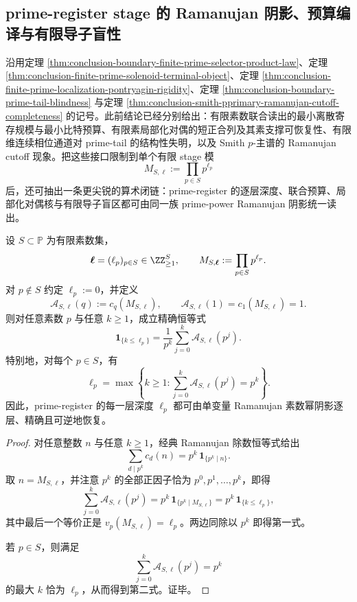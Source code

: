 \subsection{prime-register stage 的 Ramanujan 阴影、预算编译与有限导子盲性}\label{subsec:conclusion-prime-register-ramanujan-shadow-budget-localization-blindness}
沿用定理 \ref{thm:conclusion-boundary-finite-prime-selector-product-law}、定理 \ref{thm:conclusion-finite-prime-solenoid-terminal-object}、定理 \ref{thm:conclusion-finite-prime-localization-pontryagin-rigidity}、定理 \ref{thm:conclusion-boundary-prime-tail-blindness} 与定理 \ref{thm:conclusion-smith-pprimary-ramanujan-cutoff-completeness} 的记号。此前结论已经分别给出：有限素数联合读出的最小离散寄存规模与最小比特预算、有限素局部化对偶的短正合列及其素支撑可恢复性、有限维连续相位通道对 prime-tail 的结构性失明，以及 Smith \(p\)-主谱的 Ramanujan cutoff 现象。把这些接口限制到单个有限 stage 模
\[
M_{S,\boldsymbol\ell}:=\prod_{p\in S}p^{\ell_p}
\]
后，还可抽出一条更尖锐的算术闭链：prime-register 的逐层深度、联合预算、局部化对偶核与有限导子盲区都可由同一族 prime-power Ramanujan 阴影统一读出。

\begin{theorem}\label{thm:conclusion-prime-register-stage-ramanujan-layer-detection}
设 \(S\subset \mathbb P\) 为有限素数集，
\[
\boldsymbol\ell=(\ell_p)_{p\in S}\in \ZZ_{\ge 1}^{S},
\qquad
M_{S,\boldsymbol\ell}:=\prod_{p\in S}p^{\ell_p}.
\]
对 \(p\notin S\) 约定 \(\ell_p:=0\)，并定义
\[
\mathcal A_{S,\boldsymbol\ell}(q):=c_q(M_{S,\boldsymbol\ell}),
\qquad
\mathcal A_{S,\boldsymbol\ell}(1)=c_1(M_{S,\boldsymbol\ell})=1.
\]
则对任意素数 \(p\) 与任意 \(k\ge 1\)，成立精确恒等式
\[
\mathbf 1_{\{k\le \ell_p\}}
=
\frac{1}{p^k}\sum_{j=0}^{k}\mathcal A_{S,\boldsymbol\ell}(p^j).
\]
特别地，对每个 \(p\in S\)，有
\[
\ell_p
=
\max\left\{
k\ge 1:
\sum_{j=0}^{k}\mathcal A_{S,\boldsymbol\ell}(p^j)=p^k
\right\}.
\]
因此，prime-register 的每一层深度 \(\ell_p\) 都可由单变量 Ramanujan 素数幂阴影逐层、精确且可逆地恢复。
\end{theorem}
\begin{proof}
对任意整数 \(n\) 与任意 \(k\ge 1\)，经典 Ramanujan 除数恒等式给出
\[
\sum_{d\mid p^k}c_d(n)=p^k\,\mathbf 1_{\{p^k\mid n\}}.
\]
取 \(n=M_{S,\boldsymbol\ell}\)，并注意 \(p^k\) 的全部正因子恰为 \(p^0,p^1,\dots,p^k\)，即得
\[
\sum_{j=0}^{k}\mathcal A_{S,\boldsymbol\ell}(p^j)
=
p^k\,\mathbf 1_{\{p^k\mid M_{S,\boldsymbol\ell}\}}
=
p^k\,\mathbf 1_{\{k\le \ell_p\}},
\]
其中最后一个等价正是 \(v_p(M_{S,\boldsymbol\ell})=\ell_p\)。两边同除以 \(p^k\) 即得第一式。

若 \(p\in S\)，则满足
\[
\sum_{j=0}^{k}\mathcal A_{S,\boldsymbol\ell}(p^j)=p^k
\]
的最大 \(k\) 恰为 \(\ell_p\)，从而得到第二式。证毕。
\end{proof}

